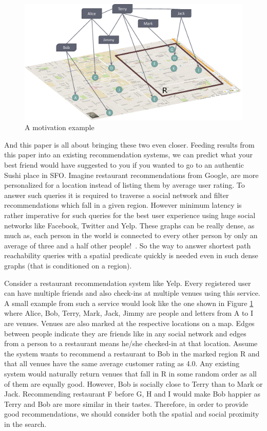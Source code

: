 \begin{figure}[t]
	\centering
	\includegraphics[width=0.88\linewidth]{images/a_motivation_example.eps}
	\caption{A motivation example}
	\label{fig:begin-example}
\end{figure}

And this paper is all about bringing these two even closer. Feeding results from this paper into an existing recommendation systems, we can predict what your best friend would have suggested to you if you wanted to go to an authentic Sushi place in SFO. Imagine restaurant recommendations from Google, are more personalized for a location instead of listing them by average user rating. To answer such queries it is required to traverse a social network and filter recommendations which fall in a given region. However minimum latency is rather imperative for such queries for the best user experience using huge social networks like Facebook, Twitter and Yelp. These graphs can be really dense, as much as, each person in the world is connected to every other person by only an average of three and a half other people!~\cite{Taa}. So the way to answer shortest path reachability queries with a spatial predicate quickly is needed even in such dense graphs (that is conditioned on a region).

Consider a restaurant recommendation system like Yelp. Every registered user can have multiple friends and also check-ins at multiple venues using this service. A small example from such a service would look like the one shown in Figure \ref{fig:begin-example} where Alice, Bob, Terry, Mark, Jack, Jimmy are people and letters from A to I are venues. Venues are also marked at the respective locations on a map. Edges between people indicate they are friends like in any social network and edges from a person to a restaurant means he/she checked-in at that location. Assume the system wants to recommend a restaurant to Bob in the marked region R and that all venues have the same average customer rating as 4.0. Any existing system would naturally return venues that fall in R in some random order as all of them are equally good. However, Bob is socially close to Terry than to Mark or Jack. Recommending restaurant F before G, H and I would make Bob happier as Terry and Bob are more similar in their tastes. Therefore, in order to provide good recommendations, we should consider both the spatial and social proximity in the search.

